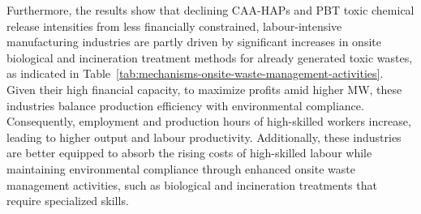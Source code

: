 \documentclass[12pt, english]{article}
\begin{document}
    Furthermore, the results show that declining CAA-HAPs and PBT toxic chemical release intensities from less financially constrained, labour-intensive manufacturing industries are partly driven by significant increases in onsite biological and incineration treatment methods for already generated toxic wastes, as indicated in Table~\ref{tab:mechanisms-onsite-waste-management-activities}. Given their high financial capacity, to maximize profits amid higher MW, these industries balance production efficiency with environmental compliance. Consequently, employment and production hours of high-skilled workers increase, leading to higher output and labour productivity. Additionally, these industries are better equipped to absorb the rising costs of high-skilled labour while maintaining environmental compliance through enhanced onsite waste management activities, such as biological and incineration treatments that require specialized skills.
\end{document}
